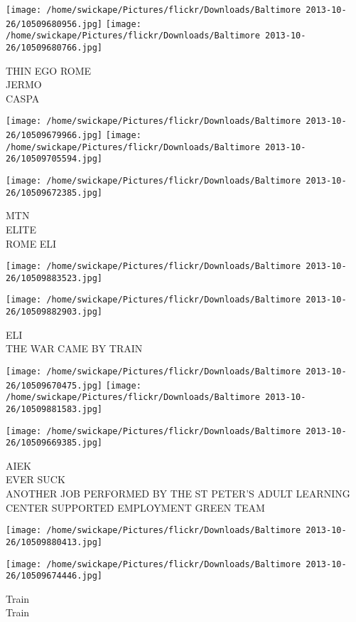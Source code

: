 \documentclass[10pt,letterpaper]{article}
\begin{document}
\vspace{0.25in}
\texttt{[image: /home/swickape/Pictures/flickr/Downloads/Baltimore 2013-10-26/10509680956.jpg]}
\texttt{[image: /home/swickape/Pictures/flickr/Downloads/Baltimore 2013-10-26/10509680766.jpg]}

THIN EGO ROME\\
JERMO\\
CASPA
\pagebreak

\texttt{[image: /home/swickape/Pictures/flickr/Downloads/Baltimore 2013-10-26/10509679966.jpg]}
\texttt{[image: /home/swickape/Pictures/flickr/Downloads/Baltimore 2013-10-26/10509705594.jpg]}

\texttt{[image: /home/swickape/Pictures/flickr/Downloads/Baltimore 2013-10-26/10509672385.jpg]}

MTN\\
ELITE\\
ROME ELI
\pagebreak

\texttt{[image: /home/swickape/Pictures/flickr/Downloads/Baltimore 2013-10-26/10509883523.jpg]}

\vspace{0.25in}
\texttt{[image: /home/swickape/Pictures/flickr/Downloads/Baltimore 2013-10-26/10509882903.jpg]}

ELI\\
THE WAR CAME BY TRAIN
\pagebreak

\texttt{[image: /home/swickape/Pictures/flickr/Downloads/Baltimore 2013-10-26/10509670475.jpg]}
\texttt{[image: /home/swickape/Pictures/flickr/Downloads/Baltimore 2013-10-26/10509881583.jpg]}

\texttt{[image: /home/swickape/Pictures/flickr/Downloads/Baltimore 2013-10-26/10509669385.jpg]}

AIEK\\
EVER SUCK\\
ANOTHER JOB PERFORMED BY THE ST PETER'S ADULT LEARNING CENTER SUPPORTED EMPLOYMENT GREEN TEAM
\pagebreak

\texttt{[image: /home/swickape/Pictures/flickr/Downloads/Baltimore 2013-10-26/10509880413.jpg]}

\vspace{0.25in}
\texttt{[image: /home/swickape/Pictures/flickr/Downloads/Baltimore 2013-10-26/10509674446.jpg]}

Train\\
Train
\pagebreak
\end{document}
